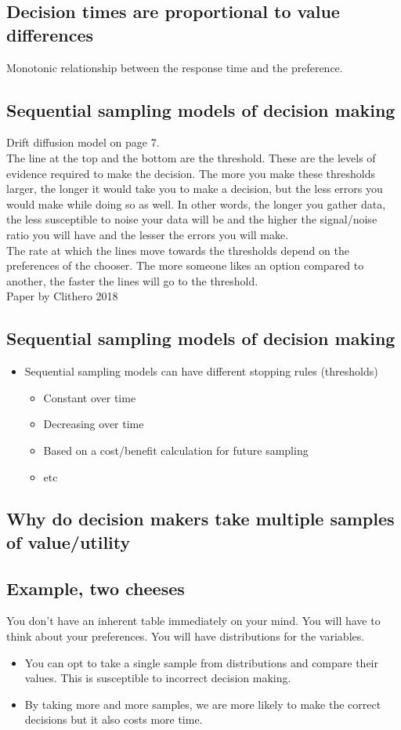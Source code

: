  \subsection{Decision times are proportional to value differences}
 Monotonic relationship between the response time and the preference.
 \subsection{Sequential sampling models of decision making}
 Drift diffusion model on page 7.
\\The line at the top and the bottom are the threshold. These are the levels of evidence required to make the decision. The more you make these thresholds larger, the longer it would take you to make a decision, but the less errors you would make while doing so as well. In other words, the longer you gather data, the less susceptible to noise your data will be and the higher the signal/noise ratio you will have and the lesser the errors you will make.
\\The rate at which the lines move towards the thresholds depend on the preferences of the chooser. The more someone likes an option compared to another, the faster the lines will go to the threshold.
\\Paper by Clithero 2018
\subsection{Sequential sampling models of decision making}
\begin{itemize}
    \item Sequential sampling models can have different stopping rules (thresholds)
    \begin{itemize}
        \item Constant over time
        \item Decreasing over time
        \item Based on a cost/benefit calculation for future sampling
        \item etc
    \end{itemize}
\end{itemize}

\subsection{Why do decision makers take multiple samples of value/utility}
\subsection{Example, two cheeses}
You don't have an inherent table immediately on your mind. You will have to think about your preferences. You will have distributions for the variables.
\begin{itemize}
    \item You can opt to take a single sample from distributions and compare their values. This is susceptible to incorrect decision making.
    \item By taking more and more samples, we are more likely to make the correct decisions but it also costs more time.
\end{itemize}
